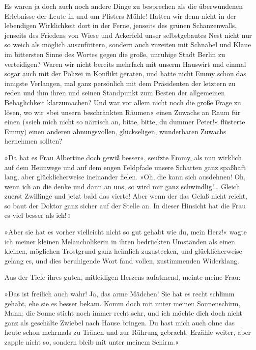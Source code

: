 Es waren ja doch auch noch andere Dinge zu besprechen als die
überwundenen Erlebnisse der Leute in und um Pfisters Mühle! Hatten
wir denn nicht in der lebendigen Wirklichkeit dort in der Ferne,
jenseits des grünen Schanzenwalls, jenseits des Friedens von Wiese
und Ackerfeld unser selbstgebautes Nest nicht nur so weich als
möglich auszufüttern, sondern auch zuzeiten mit Schnabel und Klaue
im bittersten Sinne des Wortes gegen die große, unruhige Stadt
Berlin zu verteidigen? Waren wir nicht bereits mehrfach mit unserm
Hauswirt und einmal sogar auch mit der Polizei in Konflikt geraten,
und hatte nicht Emmy schon das innigste Verlangen, mal ganz
persönlich mit dem Präsidenten der letztern zu reden und ihm ihren
und seinen Standpunkt zum Besten der allgemeinen Behaglichkeit
klarzumachen? Und war vor allem nicht noch die große Frage zu
lösen, wo wir »bei unsern beschränkten Räumen« einen Zuwachs an
Raum für einen (»sieh mich nicht so närrisch an, bitte, bitte, du
dummer Peter!« flüsterte Emmy) einen anderen ahnungsvollen,
glückseligen, wunderbaren Zuwachs hernehmen sollten?

»Da hat es Frau Albertine doch gewiß besser«, seufzte Emmy, als nun
wirklich auf dem Heimwege und auf dem engen Feldpfade unsere
Schatten ganz spaßhaft lang, aber glücklicherweise ineinander
fielen. »Oh, die kann sich ausdehnen! Oh, wenn ich an die denke und
dann an uns, so wird mir ganz schwindlig!\ldots{} Gleich zuerst
Zwillinge und jetzt bald das vierte! Aber wenn der das Gelaß nicht
reicht, so baut der Doktor ganz sicher auf der Stelle an. In dieser
Hinsicht hat die Frau es viel besser als ich!«

»Aber sie hat es vorher vielleicht nicht so gut gehabt wie du, mein
Herz!« wagte ich meiner kleinen Melancholikerin in ihren bedrückten
Umständen als einen kleinen, möglichen Trostgrund ganz heimlich
zuzustecken, und glücklicherweise gelang es, und dies beruhigende
Wort fand vollen, zustimmenden Widerklang.

Aus der Tiefe ihres guten, mitleidigen Herzens aufatmend, meinte
meine Frau:

»Das ist freilich auch wahr! Ja, das arme Mädchen! Sie hat es recht
schlimm gehabt, ehe sie es besser bekam. Komm doch mit unter meinen
Sonnenschirm, Mann; die Sonne sticht noch immer recht sehr, und ich
möchte dich doch nicht ganz als geschälte Zwiebel nach Hause
bringen. Du hast mich auch ohne das heute schon mehrmals zu Tränen
und zur Rührung gebracht. Erzähle weiter, aber zapple nicht so,
sondern bleib mit unter meinem Schirm.«

